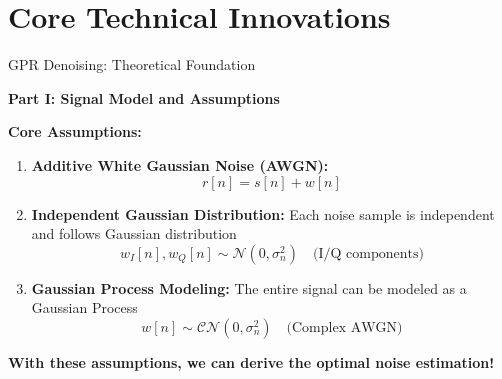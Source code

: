 \documentclass[aspectratio=169]{beamer}
\begin{document}
\section{Core Technical Innovations}

\begin{frame}{GPR Denoising: Theoretical Foundation}
\begin{center}
\textcolor{zjutblue}{\Large \textbf{Part I: Signal Model and Assumptions}}
\end{center}

\vspace{0.5cm}
\textbf{Core Assumptions:}
\begin{enumerate}
\item \textbf{Additive White Gaussian Noise (AWGN):}
   \begin{equation}
   r[n] = s[n] + w[n]
   \end{equation}

\item \textbf{Independent Gaussian Distribution:} Each noise sample is independent and follows Gaussian distribution
   \begin{equation}
   w_I[n], w_Q[n] \sim \mathcal{N}(0, \sigma_n^2) \quad \text{(I/Q components)}
   \end{equation}

\item \textbf{Gaussian Process Modeling:} The entire signal can be modeled as a Gaussian Process
   \begin{equation}
   w[n] \sim \mathcal{CN}(0, \sigma_n^2) \quad \text{(Complex AWGN)}
   \end{equation}
\end{enumerate}

\vspace{0.3cm}
\begin{center}
\textcolor{zjutgreen}{\textbf{With these assumptions, we can derive the optimal noise estimation!}}
\end{center}
\end{frame}
\end{document}
